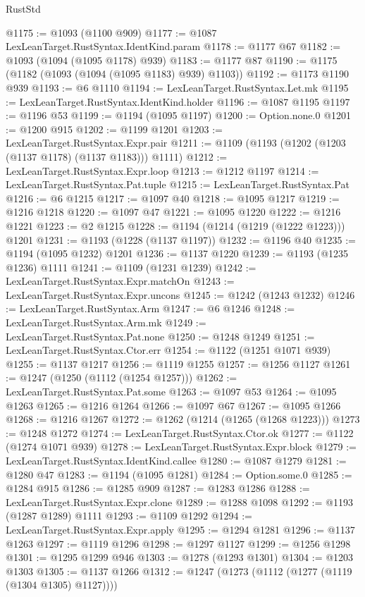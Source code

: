 \begin{lexlean}{RustStd}
\begin{coremodule}
@1175 := @1093 (@1100 @909)
@1177 := @1087 LexLeanTarget.RustSyntax.IdentKind.param
@1178 := @1177 @67
@1182 := @1093 (@1094 (@1095 @1178) @939)
@1183 := @1177 @87
@1190 := @1175 (@1182 (@1093 (@1094 (@1095 @1183) @939) @1103))
@1192 := @1173 @1190 @939
@1193 := @6 @1110
@1194 := LexLeanTarget.RustSyntax.Let.mk
@1195 := LexLeanTarget.RustSyntax.IdentKind.holder
@1196 := @1087 @1195
@1197 := @1196 @53
@1199 := @1194 (@1095 @1197)
@1200 := Option.none.{0}
@1201 := @1200 @915
@1202 := @1199 @1201
@1203 := LexLeanTarget.RustSyntax.Expr.pair
@1211 := @1109 (@1193 (@1202 (@1203 (@1137 @1178) (@1137 @1183))) @1111)
@1212 := LexLeanTarget.RustSyntax.Expr.loop
@1213 := @1212 @1197
@1214 := LexLeanTarget.RustSyntax.Pat.tuple
@1215 := LexLeanTarget.RustSyntax.Pat
@1216 := @6 @1215
@1217 := @1097 @40
@1218 := @1095 @1217
@1219 := @1216 @1218
@1220 := @1097 @47
@1221 := @1095 @1220
@1222 := @1216 @1221
@1223 := @2 @1215
@1228 := @1194 (@1214 (@1219 (@1222 @1223))) @1201
@1231 := @1193 (@1228 (@1137 @1197))
@1232 := @1196 @40
@1235 := @1194 (@1095 @1232) @1201
@1236 := @1137 @1220
@1239 := @1193 (@1235 @1236) @1111
@1241 := @1109 (@1231 @1239)
@1242 := LexLeanTarget.RustSyntax.Expr.matchOn
@1243 := LexLeanTarget.RustSyntax.Expr.uncons
@1245 := @1242 (@1243 @1232)
@1246 := LexLeanTarget.RustSyntax.Arm
@1247 := @6 @1246
@1248 := LexLeanTarget.RustSyntax.Arm.mk
@1249 := LexLeanTarget.RustSyntax.Pat.none
@1250 := @1248 @1249
@1251 := LexLeanTarget.RustSyntax.Ctor.err
@1254 := @1122 (@1251 @1071 @939)
@1255 := @1137 @1217
@1256 := @1119 @1255
@1257 := @1256 @1127
@1261 := @1247 (@1250 (@1112 (@1254 @1257)))
@1262 := LexLeanTarget.RustSyntax.Pat.some
@1263 := @1097 @53
@1264 := @1095 @1263
@1265 := @1216 @1264
@1266 := @1097 @67
@1267 := @1095 @1266
@1268 := @1216 @1267
@1272 := @1262 (@1214 (@1265 (@1268 @1223)))
@1273 := @1248 @1272
@1274 := LexLeanTarget.RustSyntax.Ctor.ok
@1277 := @1122 (@1274 @1071 @939)
@1278 := LexLeanTarget.RustSyntax.Expr.block
@1279 := LexLeanTarget.RustSyntax.IdentKind.callee
@1280 := @1087 @1279
@1281 := @1280 @47
@1283 := @1194 (@1095 @1281)
@1284 := Option.some.{0}
@1285 := @1284 @915
@1286 := @1285 @909
@1287 := @1283 @1286
@1288 := LexLeanTarget.RustSyntax.Expr.clone
@1289 := @1288 @1098
@1292 := @1193 (@1287 @1289) @1111
@1293 := @1109 @1292
@1294 := LexLeanTarget.RustSyntax.Expr.apply
@1295 := @1294 @1281
@1296 := @1137 @1263
@1297 := @1119 @1296
@1298 := @1297 @1127
@1299 := @1256 @1298
@1301 := @1295 @1299 @946
@1303 := @1278 (@1293 @1301)
@1304 := @1203 @1303
@1305 := @1137 @1266
@1312 := @1247 (@1273 (@1112 (@1277 (@1119 (@1304 @1305) @1127))))

\end{coremodule}
\end{lexlean}
